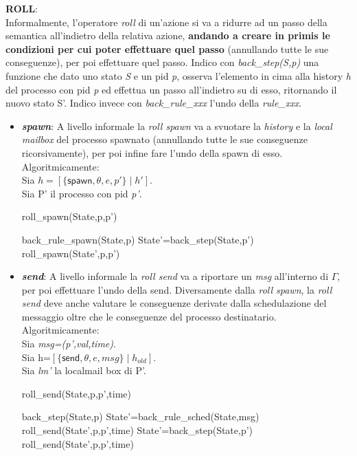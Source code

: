 \documentclass[background.tex]{subfiles}
\begin{document}
\textbf{ROLL}:\\
	Informalmente, l'operatore \textit{roll} di un'azione si va a ridurre ad un passo della semantica all'indietro della relativa azione, \textbf{andando a creare in primis le condizioni per cui poter effettuare quel passo} (annullando tutte le sue conseguenze), per poi effettuare quel passo.
	Indico con \textit{back\_step(S,p)} una funzione che dato uno stato \textit{S} e un pid \textit{p}, osserva l'elemento in cima alla history \textit{h} del processo con pid \textit{p} ed effettua un passo all'indietro su di esso, ritornando il nuovo stato S'.
	Indico invece con \textit{back\_rule\_xxx} l'undo della \textit{rule\_xxx}.
	\begin{itemize}
		\item \textit{\textbf{spawn}}: A livello informale la \textit{roll spawn} va a svuotare la \textit{history} e la \textit{local mailbox} del processo spawnato (annullando tutte le sue conseguenze ricorsivamente), per poi infine fare l'undo della spawn di esso. Algoritmicamente:\\
		Sia $\displaystyle h=[\{\mathsf{spawn},\theta,e,p'\} \mid h']$.\\
		Sia P' il processo con pid \textit{p'}.
		\begin{algorithm}[H]
		\caption{roll\_spawn(State,p,p')}
		\begin{algorithmic}
			\RETURN back\_rule\_spawn(State,p)
		\ELSE
			\STATE State'=back\_step(State,p')
			\RETURN roll\_spawn(State',p,p')
		\ENDIF
		\end{algorithmic}
		\end{algorithm}
		\item \textit{\textbf{send}}: 
		A livello informale la \textit{roll send} va a riportare un \textit{msg} all'interno di $\Gamma$, per poi effettuare l'undo della send. Diversamente dalla \textit{roll spawn}, la \textit{roll send} deve anche valutare le conseguenze derivate dalla schedulazione del messaggio oltre che le conseguenze del processo destinatario. Algoritmicamente:\\
		Sia \textit{msg=(p',val,time)}.\\
		Sia h=$\displaystyle [\{\mathsf{send},\theta,e,msg\} \mid h_{old}]$.\\
		Sia \textit{lm'} la localmail box di P'.
		\begin{algorithm}[H]
		\caption{roll\_send(State,p,p',time)}
		\begin{algorithmic}
		\IF { msg $\in$ $\Gamma$} 
			\RETURN back\_step(State,p)
		\ELSE
			\IF { lm'==[msg $\mid$ $lm_{rest}$]} 
				\STATE State'=back\_rule\_sched(State,msg)
				\RETURN roll\_send(State',p,p',time)
			\ELSE
				\STATE State'=back\_step(State,p')
				\RETURN roll\_send(State',p,p',time)
			\ENDIF
		\ENDIF
		\end{algorithmic}
		\end{algorithm}
	\end{itemize}
\end{document}
